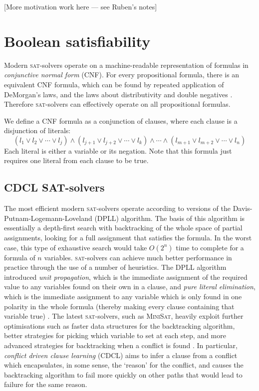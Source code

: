 \documentclass[proof,pdftex,11pt,a4,titlepage]{article}
\newcommand{\sat}{\textsc{sat}}
\begin{document}
[More motivation work here --- see Ruben's notes]

\section{Boolean satisfiability}

Modern \sat{}-solvers operate on a machine-readable representation of formulas in \emph{conjunctive normal form} (CNF). For every propositional formula, there is an equivalent CNF formula, which can be found by repeated application of DeMorgan's laws, and the laws about distributivity and double negatives \cite{Plaisted:1986}. Therefore \sat{}-solvers can effectively operate on all propositional formulas.

We define a CNF formula as a conjunction of clauses, where each clause is a disjunction of literals:
\[(l_1 \vee l_2 \vee \cdots \vee l_j) \wedge (l_{j+1} \vee l_{j+2} \vee \cdots \vee l_k) \wedge \cdots \wedge (l_{m+1} \vee l_{m+2} \vee \cdots \vee l_n)\]
Each literal is either a variable or its negation. Note that this formula just requires one literal from each clause to be true.

\subsection{CDCL SAT-solvers}

The most efficient modern \sat{}-solvers operate according to versions of the Davis-Putnam-Logemann-Loveland (DPLL) algorithm. The basis of this algorithm is essentially a depth-first search with backtracking of the whole space of partial assignments, looking for a full assignment that satisfies the formula. In the worst case, this type of exhaustive search would take $O(2^n)$ time to complete for a formula of $n$ variables. \sat{}-solvers can achieve much better performance in practice through the use of a number of heuristics. The DPLL algorithm introduced \emph{unit propagation}, which is the immediate assignment of the required value to any variables found on their own in a clause, and \emph{pure literal elimination}, which is the immediate assignment to any variable which is only found in one polarity in the whole formula (thereby making every clause containing that variable true) \cite{Davis:1962}. The latest \sat{}-solvers, such as \textsc{MiniSat}, heavily exploit further optimisations such as faster data structures for the backtracking algorithm, better strategies for picking which variable to set at each step, and more advanced strategies for backtracking when a conflict is found \cite{Een:2003}. In particular, \emph{conflict driven clause learning} (CDCL) aims to infer a clause from a conflict which encapsulates, in some sense, the `reason' for the conflict, and causes the backtracking algorithm to fail more quickly on other paths that would lead to failure for the same reason.
\end{document}
